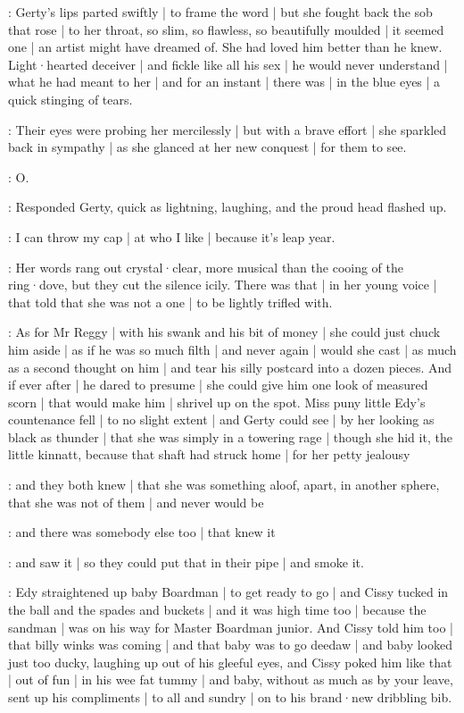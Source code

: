 \gertyNovel:
Gerty's lips parted swiftly |
to frame the word |
but she fought back the sob that rose |
to her throat,
so slim,
so flawless,
so beautifully moulded |
it seemed one |
an artist might have dreamed of.
She had loved him better than he knew.
Light·hearted deceiver |
and fickle like all his sex |
he would never understand |
what he had meant to her |
and for an instant |
there was |
in the blue eyes |
a quick stinging of tears.

\gertyRomantic:
Their eyes were probing her mercilessly |
but with a brave effort |
she sparkled back in sympathy |
as she glanced at her new conquest |
for them to see.

\gerty:
O.

:
Responded Gerty,
quick as lightning,
laughing,
and the proud head flashed up.

\gerty:
I can throw my cap |
at who I like |%
because it's leap year.

\gertyNovel:
Her words rang out crystal·clear,
more musical
than the cooing of the ring·dove,
but they cut the silence icily.
There was that |
in her young voice |
that told
that she was not a one |
to be lightly trifled with.

\gertyJudgy:
As for Mr Reggy |
with his swank and his bit of money |
she could just chuck him aside |
as if he was so much filth |
and never again |
would she cast |
as much as a second thought on him |
and tear his silly postcard into a dozen pieces.
And if ever after |
he dared to presume |
she could give him one look of measured scorn |
that would make him |
shrivel up on the spot.
Miss puny little Edy's countenance fell |
to no slight extent |
and Gerty could see |
by her looking as black as thunder |%
that she was simply in a towering rage |
though she hid it,
the little kinnatt,
because that shaft had struck home |
for her petty jealousy

\gertyNovel:
and they both knew |
that she was something aloof,
apart,
in another sphere,
that she was not of them |
and never would be

\gertySex:
and there was somebody else too |
that knew it

\gertyJudgy:
and saw it |
so they could put that in their pipe |
and smoke it.

:
Edy straightened up baby Boardman |
to get ready to go |
and Cissy tucked in
the ball and the spades and buckets |
and it was high time too |
because the sandman |
was on his way for Master Boardman junior.
And Cissy told him too |
that billy winks was coming |
and that baby was to go deedaw |
and baby looked just too ducky,
laughing up out of his gleeful eyes,
and Cissy poked him like that |%
out of fun |
in his wee fat tummy |
and baby,
without as much as by your leave,
sent up his compliments |
to all and sundry |
on to his brand·new dribbling bib.

